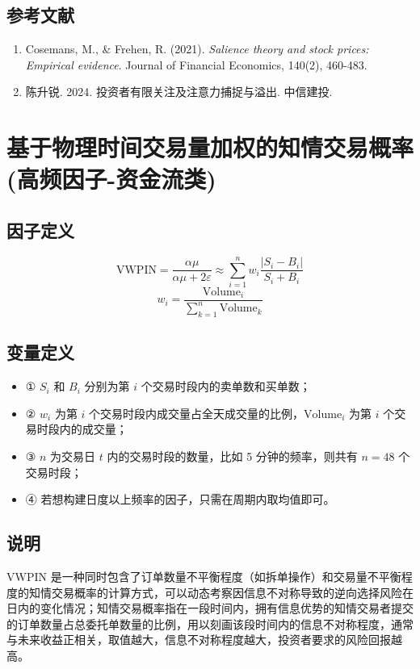 \documentclass{article}
\begin{document}
\subsection{参考文献}
\begin{enumerate}
    \item Cosemans, M., \& Frehen, R. (2021). \textit{Salience theory and stock prices: Empirical evidence}. Journal of Financial Economics, 140(2), 460-483.
    \item 陈升锐. 2024. 投资者有限关注及注意力捕捉与溢出. 中信建投.
\end{enumerate}

\section{基于物理时间交易量加权的知情交易概率(高频因子-资金流类)}

\subsection{因子定义}
\begin{equation}
    \mathrm{VWPIN} = \frac{\alpha\mu}{\alpha\mu + 2\varepsilon} \approx \sum_{i=1}^{n} w_i \frac{|S_i - B_i|}{S_i + B_i}
\end{equation}
\begin{equation}
    w_i = \frac{\mathrm{Volume}_i}{\sum_{k=1}^{n} \mathrm{Volume}_k}
\end{equation}

\subsection{变量定义}
\begin{itemize}
    \item ① \( S_i \) 和 \( B_i \) 分别为第 \( i \) 个交易时段内的卖单数和买单数；
    \item ② \( w_i \) 为第 \( i \) 个交易时段内成交量占全天成交量的比例，\( \mathrm{Volume}_i \) 为第 \( i \) 个交易时段内的成交量；
    \item ③ \( n \) 为交易日 \( t \) 内的交易时段的数量，比如 5 分钟的频率，则共有 \( n=48 \) 个交易时段；
    \item ④ 若想构建日度以上频率的因子，只需在周期内取均值即可。
\end{itemize}

\subsection{说明}
VWPIN 是一种同时包含了订单数量不平衡程度（如拆单操作）和交易量不平衡程度的知情交易概率的计算方式，可以动态考察因信息不对称导致的逆向选择风险在日内的变化情况；知情交易概率指在一段时间内，拥有信息优势的知情交易者提交的订单数量占总委托单数量的比例，用以刻画该段时间内的信息不对称程度，通常与未来收益正相关，取值越大，信息不对称程度越大，投资者要求的风险回报越高。
\end{document}
